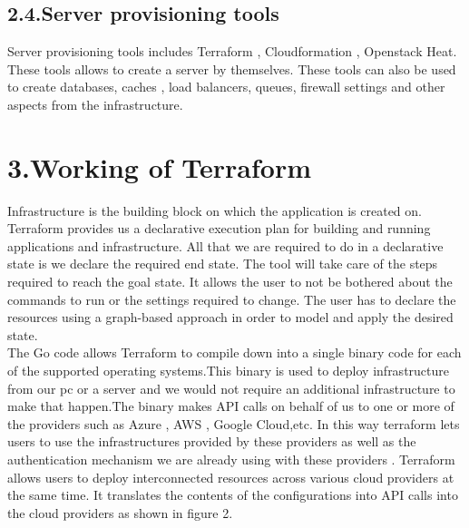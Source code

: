 \documentclass[9pt,twocolumn,twoside]{../../styles/osajnl}
\begin{document}
\subsection{2.4.Server provisioning tools}
Server provisioning tools includes Terraform , Cloudformation ,
Openstack Heat. These tools allows to create a server by
themselves. These tools can also be used to create databases, caches ,
load balancers, queues, firewall settings and other aspects from the
infrastructure\cite{www-terraform-upandrunning}.

\section{3.Working of Terraform}
Infrastructure is the building block on which the application is
created on.  Terraform provides us a declarative execution plan for
building and running applications and infrastructure. All that we are
required to do in a declarative state is we declare the required end
state. The tool will take care of the steps required to reach the goal
state. It allows the user to not be bothered about the commands to run
or the settings required to change.  The user has to declare the
resources using a graph-based approach in order to model and apply the
desired state\cite{www-terraform-book}.\\ The Go code allows Terraform
to compile down into a single binary code for each of the supported
operating systems.This binary is used to deploy infrastructure from
our pc or a server and we would not require an additional
infrastructure to make that happen.The binary makes API calls on
behalf of us to one or more of the providers such as Azure , AWS ,
Google Cloud,etc. In this way terraform lets users to use the
infrastructures provided by these providers as well as the
authentication mechanism we are already using with these providers
\cite{www-terraform-upandrunning}. Terraform allows users to deploy
interconnected resources across various cloud providers at the same
time. It translates the contents of the configurations into API calls
into the cloud providers as shown in figure 2.
\end{document}
